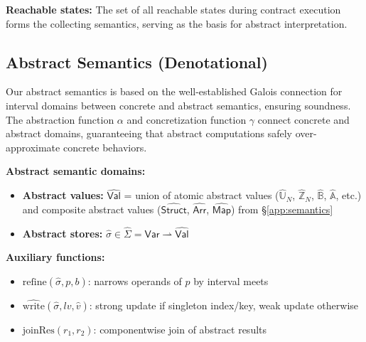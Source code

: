 \documentclass[pdflatex,sn-basic]{sn-jnl}%
\theoremstyle{thmstyleone}%
\theoremstyle{thmstyletwo}%
\theoremstyle{thmstylethree}%
\begin{document}
\noindent\textbf{Reachable states:} The set of all reachable states during contract execution forms the collecting semantics, serving as the basis for abstract interpretation.

\subsection{Abstract Semantics (Denotational)}

Our abstract semantics is based on the well-established Galois connection for interval domains between concrete and abstract semantics, ensuring soundness. The abstraction function $\alpha$ and concretization function $\gamma$ connect concrete and abstract domains, guaranteeing that abstract computations safely over-approximate concrete behaviors.

\smallskip
\noindent\textbf{Abstract semantic domains:}
\begin{itemize}[topsep=0pt,itemsep=0pt,parsep=0pt]
\item \textbf{Abstract values:} $\widehat{\mathsf{Val}}$ = union of atomic abstract values ($\widehat{\mathbb{U}}_N$, $\widehat{\mathbb{Z}}_N$, $\widehat{\mathbb{B}}$, $\widehat{\mathbb{A}}$, etc.) and composite abstract values ($\widehat{\mathsf{Struct}}$, $\widehat{\mathsf{Arr}}$, $\widehat{\mathsf{Map}}$) from \S\ref{app:semantics}
\item \textbf{Abstract stores:} $\hat{\sigma} \in \widehat{\Sigma} = \mathsf{Var} \rightharpoonup \widehat{\mathsf{Val}}$
\end{itemize}

\smallskip
\noindent\textbf{Auxiliary functions:}
\begin{itemize}[topsep=0pt,itemsep=0pt,parsep=0pt]
\item $\mathrm{refine}(\hat{\sigma},p,b)$: narrows operands of $p$ by interval meets
\item $\widehat{\mathrm{write}}(\hat{\sigma},\mathit{lv},\hat{v})$: strong update if singleton index/key, weak update otherwise
\item $\mathrm{joinRes}(r_1,r_2)$: componentwise join of abstract results
\end{itemize}
\end{document}
